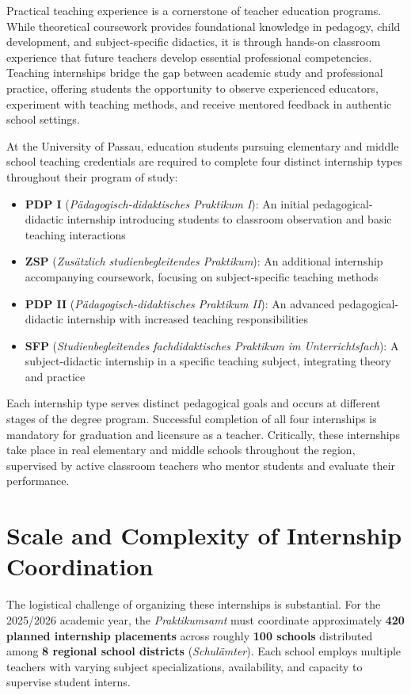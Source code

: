 \documentclass[12pt,a4paper]{report}
\begin{document}
Practical teaching experience is a cornerstone of teacher education programs. While theoretical coursework provides foundational knowledge in pedagogy, child development, and subject-specific didactics, it is through hands-on classroom experience that future teachers develop essential professional competencies. Teaching internships bridge the gap between academic study and professional practice, offering students the opportunity to observe experienced educators, experiment with teaching methods, and receive mentored feedback in authentic school settings.

At the University of Passau, education students pursuing elementary and middle school teaching credentials are required to complete four distinct internship types throughout their program of study:

\begin{itemize}
    \item \textbf{PDP I} (\textit{Pädagogisch-didaktisches Praktikum I}): An initial pedagogical-didactic internship introducing students to classroom observation and basic teaching interactions
    \item \textbf{ZSP} (\textit{Zusätzlich studienbegleitendes Praktikum}): An additional internship accompanying coursework, focusing on subject-specific teaching methods
    \item \textbf{PDP II} (\textit{Pädagogisch-didaktisches Praktikum II}): An advanced pedagogical-didactic internship with increased teaching responsibilities
    \item \textbf{SFP} (\textit{Studienbegleitendes fachdidaktisches Praktikum im Unterrichtsfach}): A subject-didactic internship in a specific teaching subject, integrating theory and practice
\end{itemize}

Each internship type serves distinct pedagogical goals and occurs at different stages of the degree program. Successful completion of all four internships is mandatory for graduation and licensure as a teacher. Critically, these internships take place in real elementary and middle schools throughout the region, supervised by active classroom teachers who mentor students and evaluate their performance.

\section{Scale and Complexity of Internship Coordination}

The logistical challenge of organizing these internships is substantial. For the 2025/2026 academic year, the \textit{Praktikumsamt} must coordinate approximately \textbf{420 planned internship placements} across roughly \textbf{100 schools} distributed among \textbf{8 regional school districts} (\textit{Schulämter}). Each school employs multiple teachers with varying subject specializations, availability, and capacity to supervise student interns.
\end{document}
